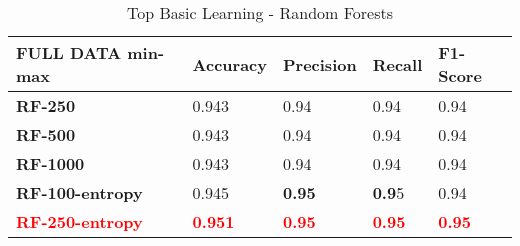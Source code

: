 \documentclass[10pt, conference, compsocconf]{IEEEtran}
\newcommand{\red}[1]{\textcolor{red}{\bf #1}}
\begin{document}
\begin{center}
	\begin{table}[t]
		\centering \footnotesize
		\vspace{0.01cm}
		\caption{Top Basic Learning - Random Forests}
		\hspace{1cm}
		\begin{tabularx}{\linewidth}{ l  X  X  X  X }
			\hline
			\textbf{FULL DATA min-max} &	\textbf{Accuracy}&	\textbf{Precision}&	\textbf{Recall}&	\textbf{F1-Score} \\ \hline
			
			
			\textbf{RF-250}&	0.943&	0.94&	0.94&	0.94\\ \hline
			\textbf{RF-500}&	0.943&	0.94&	0.94&	0.94\\ \hline
			\textbf{RF-1000}&	0.943&	0.94&	0.94&	0.94\\ \hline
			\textbf{RF-100-entropy}&	0.945&	\textbf{0.95}&	\textbf{0.9}5&	0.94\\ \hline
			\red{RF-250-entropy}&	\red{0.951}&	\red{0.95}&	\red{0.95}&	\red{0.95} \\ \hline
			
			
		\end{tabularx}\newline
		\vspace{-0.05cm}
		\label{Table7}
	\end{table} \hfil
\end{center}
\end{document}
